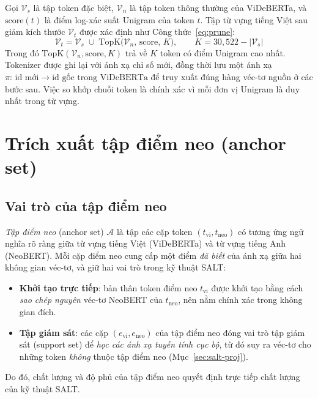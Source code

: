 Gọi $\mathcal{V}_s$ là tập token đặc biệt, $\mathcal{V}_n$ là tập token thông thường của
ViDeBERTa, và $\mathrm{score}(t)$ là điểm log-xác suất Unigram của token $t$. Tập từ vựng tiếng Việt sau giảm kích thước
$\mathcal{V}_t$ được xác định như Công thức~\eqref{eq:prune}:
\begin{equation}
  \label{eq:prune}
  \mathcal{V}_t = \mathcal{V}_s \;\cup\; \mathrm{TopK}\big(\mathcal{V}_n,\, \mathrm{score},\,
  K\big), \qquad K = 30{,}522 - |\mathcal{V}_s|
\end{equation}
Trong đó $\mathrm{TopK}(\mathcal{V}_n, \mathrm{score}, K)$ trả về $K$ token có điểm Unigram
cao nhất. Tokenizer được ghi lại với ánh xạ chỉ số mới, đồng thời lưu một ánh xạ
$\pi:\, \text{id mới} \rightarrow \text{id gốc trong ViDeBERTa}$ để truy xuất đúng hàng véc-tơ
nguồn ở các bước sau. Việc so khớp chuỗi token là chính xác vì mỗi đơn vị Unigram là duy
nhất trong từ vựng.

\section{Trích xuất tập điểm neo (anchor set)}
\label{sec:anchor}

\subsection{Vai trò của tập điểm neo}
\label{subsec:anchor-role}

\textit{Tập điểm neo} (anchor set) $\mathcal{A}$ là tập các cặp token $(t_{\mathrm{vi}},
t_{\mathrm{neo}})$ có tương ứng ngữ nghĩa rõ ràng giữa từ vựng tiếng Việt (ViDeBERTa) và từ vựng tiếng Anh (NeoBERT). Mỗi cặp điểm neo cung cấp một điểm \textit{đã biết} của ánh xạ giữa hai
không gian véc-tơ, và giữ hai vai trò trong kỹ thuật SALT:
\begin{itemize}
  \item \textbf{Khởi tạo trực tiếp}: bản thân token điểm neo $t_{\mathrm{vi}}$ được khởi tạo bằng
        cách \textit{sao chép nguyên} véc-tơ NeoBERT của $t_{\mathrm{neo}}$, nên nằm chính
        xác trong không gian đích.
  \item \textbf{Tập giám sát}: các cặp $(e_{\mathrm{vi}}, e_{\mathrm{neo}})$ của tập điểm neo đóng
        vai trò tập giám sát (support set) để \textit{học các ánh xạ tuyến tính cục bộ}, từ đó
        suy ra véc-tơ cho những token \textit{không} thuộc tập điểm neo (Mục~\ref{sec:salt-proj}).
\end{itemize}
Do đó, chất lượng và độ phủ của tập điểm neo quyết định trực tiếp chất lượng của kỹ thuật SALT.

